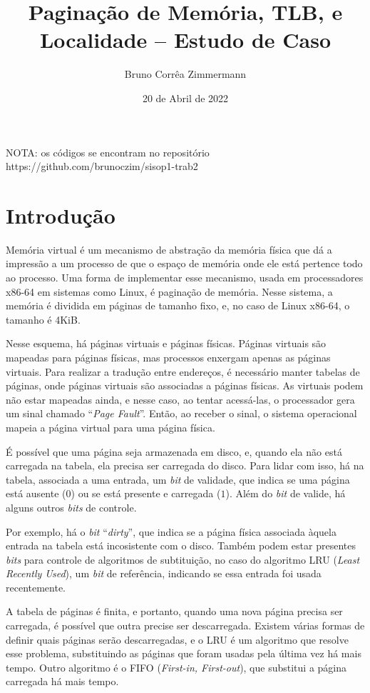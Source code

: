 \documentclass[a4paper]{article}
\title{Paginação de Memória, TLB, e Localidade -- Estudo de Caso}
\author{Bruno Corrêa Zimmermann}
\date{20 de Abril de 2022}
\begin{document}

\maketitle

NOTA: os códigos se encontram no repositório
https://github.com/brunoczim/sisop1-trab2

\section{Introdução}

Memória virtual é um mecanismo de abstração da memória física que dá a impressão
a um processo de que o espaço de memória onde ele está pertence todo ao
processo. Uma forma de implementar esse mecanismo, usada em processadores
x86-64 em sistemas como Linux, é paginação de memória. Nesse sistema, a memória
é dividida em páginas de tamanho fixo, e, no caso de Linux x86-64, o tamanho é
4KiB.

Nesse esquema, há páginas virtuais e páginas físicas. Páginas virtuais são
mapeadas para páginas físicas, mas processos enxergam apenas as páginas
virtuais. Para realizar a tradução entre endereços, é necessário manter tabelas
de páginas, onde páginas virtuais são associadas a páginas físicas. As virtuais
podem não estar mapeadas ainda, e nesse caso, ao tentar acessá-las, o
processador gera um sinal chamado ``\textit{Page Fault}''. Então, ao receber o
sinal, o sistema operacional mapeia a página virtual para uma página física.

É possível que uma página seja armazenada em disco, e, quando ela não está
carregada na tabela, ela precisa ser carregada do disco. Para lidar com isso, há
na tabela, associada a uma entrada, um \textit{bit} de validade, que indica se
uma página está ausente ($0$) ou se está presente e carregada ($1$). Além do
\textit{bit} de valide, há alguns outros \textit{bits} de controle.

Por exemplo, há o \textit{bit} ``\textit{dirty}'', que indica se a
página física associada àquela entrada na tabela está incosistente com o disco.
Também podem estar presentes \textit{bits} para controle de algoritmos de
subtituição, no caso do algoritmo LRU (\textit{Least Recently Used}), um
\textit{bit} de referência, indicando se essa entrada foi usada recentemente.

A tabela de páginas é finita, e portanto, quando uma nova página precisa ser
carregada, é possível que outra precise ser descarregada. Existem várias formas
de definir quais páginas serão descarregadas, e o LRU é um algoritmo que resolve
esse problema, substituindo as páginas que foram usadas pela última vez há mais
tempo. Outro algoritmo é o FIFO (\textit{First-in, First-out}), que substitui a
página carregada há mais tempo.
\end{document}
